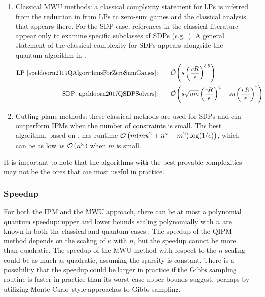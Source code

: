 \begin{refsection}
\begin{enumerate}
    \item Classical MWU methods: a classical complexity statement for LPs is inferred from the reduction in \cite{apeldoorn2019QAlgorithmsForZeroSumGames} from LPs to zero-sum games and the classical analysis that appears there. For the SDP case, references in the classical literature appear only to examine specific subclasses of SDPs (e.g.~\cite{arora2005fastAlgorithms,arora2007SDP}). A general statement of the classical complexity for SDPs appears alongside the quantum algorithm in \cite[Section 2.4]{apeldoorn2017QSDPSolvers}.
    \begin{equation}
        \begin{split}
            \text{LP \cite{apeldoorn2019QAlgorithmsForZeroSumGames}:}& \qquad \tilde{\mathcal{O}}\left(s\left(\frac{rR}{\epsilon}\right)^{3.5}\right) \\
            \text{SDP \cite{apeldoorn2017QSDPSolvers}:}& \qquad \tilde{\mathcal{O}}\left(s\sqrt{nm}\left(\frac{rR}{\epsilon}\right)^{4}+sn\left(\frac{rR}{\epsilon}\right)^7\right)
        \end{split}
\end{equation}

\item Cutting-plane methods: these classical methods are used for SDPs and can outperform IPMs when the number of constraints is small. The best algorithm, based on \cite{lee2015FasterCuttingPlaneConvexOpt,jiang2020CuttingPlane}, has runtime $\mathcal{O}\left( m(mn^2+n^{\omega}+m^2)\log(1/\epsilon) \right)$, which can be as low as $\mathcal{O}\left( n^\omega \right)$ when $m$ is small. 
\end{enumerate}
It is important to note that the algorithms with the best provable complexities may not be the ones that are most useful in practice.

\subsubsection*{Speedup}

For both the IPM and the MWU approach, there can be at most a polynomial quantum speedup: upper and lower bounds scaling polynomially with $n$ are known in both the classical and quantum cases \cite{apeldoorn2018ImprovedQSDPSolving}. The speedup of the QIPM method depends on the scaling of $\kappa$ with $n$, but the speedup cannot be more than quadratic. The speedup of the MWU method with respect to the $n$-scaling could be as much as quadratic, assuming the sparsity is constant. There is a possibility that the speedup could be larger in practice if the \hyperref[prim:GibbsSampling]{Gibbs sampling} routine is faster in practice than its worst-case upper bounds suggest, perhaps by utilizing Monte Carlo--style approaches to Gibbs sampling. 



\end{refsection}
